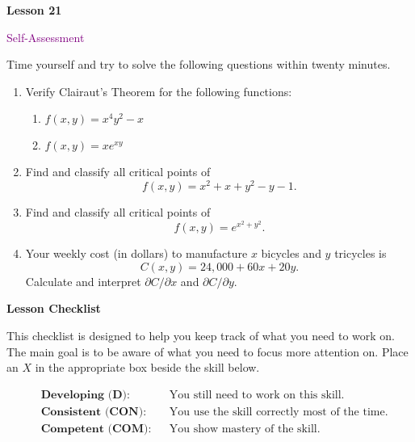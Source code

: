 \documentclass[10pt]{book}
\theoremstyle{definition}
\theoremstyle{remark}
\begin{document}
\begin{tcolorbox}[
  width=\textwidth,
  colback=gray!10, %
  colframe=white, %
  boxrule=0pt,    %
  left=1cm,       %
  right=1cm,      %
  sharp corners  %
]

\begin{minipage}[t]{0.5\textwidth}
  \Huge \textbf{Lesson 21}
\end{minipage}%
\hfill
\begin{minipage}[t]{0.5\textwidth}
  \Huge\textcolor{purple}{Self-Assessment}
\end{minipage}
\end{tcolorbox}

\begin{large}
\noindent
Time yourself and try to solve the following questions within twenty minutes. 
\begin{enumerate}
\item Verify Clairaut's Theorem for the following functions:
\begin{enumerate}
	\item  $f(x,y) = x^4y^2 - x$
	\item  $f(x,y) =xe^{xy}$ 
\end{enumerate}
\item Find and classify all critical points of \[f(x,y) = x^2 + x + y^2 - y - 1.\]\vfil
\item Find and classify all critical points of \[f(x,y) = e^{x^2+y^2}.\]\vfil
\item Your weekly cost (in dollars) to manufacture $x$ bicycles and $y$ tricycles is \[C(x, y) = 24,000 + 60x + 20y.\]  Calculate and interpret  $\partial C/\partial x$ and $\partial C/\partial y$.\vfil
\end{enumerate}

\noindent
\textbf{Lesson Checklist}
\bigskip

\noindent
This checklist is designed to help you keep track of what you need to work on. The main goal is to be aware of what you need to focus more attention on. Place an $X$ in the appropriate box beside the skill below. 
\bigskip

\noindent
\begin{align*}
&\textbf{Developing (D):} &&\textrm{You still need to work on this skill.}\\
&\textbf{Consistent (CON):} &&\textrm{You use the skill correctly most of the time.}\\
&\textbf{Competent (COM):} &&\textrm{You show mastery of the skill.} 
\end{align*}
\vfil


\end{large}
\end{document}

